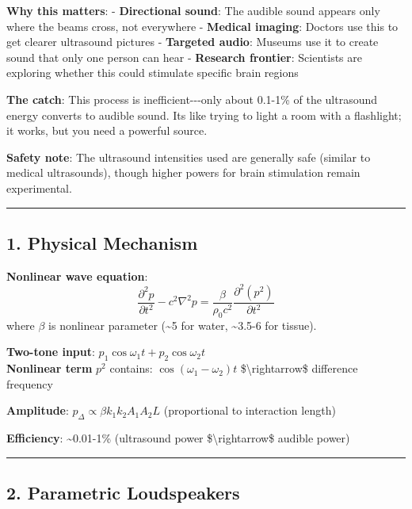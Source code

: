 \textbf{Why this matters}: - \textbf{Directional sound}: The audible
sound appears only where the beams cross, not everywhere -
\textbf{Medical imaging}: Doctors use this to get clearer ultrasound
pictures - \textbf{Targeted audio}: Museums use it to create sound that
only one person can hear - \textbf{Research frontier}: Scientists are
exploring whether this could stimulate specific brain regions

\textbf{The catch}: This process is inefficient-\/-\/-only about 0.1-1\%
of the ultrasound energy converts to audible sound. It\textquotesingle s
like trying to light a room with a flashlight; it works, but you need a
powerful source.

\textbf{Safety note}: The ultrasound intensities used are generally safe
(similar to medical ultrasounds), though higher powers for brain
stimulation remain experimental.

\begin{center}\rule{0.5\linewidth}{0.5pt}\end{center}

\subsection{\texorpdfstring{1. Physical Mechanism
}{1. Physical Mechanism }}\label{physical-mechanism}

\textbf{Nonlinear wave equation}:
\[\frac{\partial^2 p}{\partial t^2} - c^2 \nabla^2 p = \frac{\beta}{\rho_0 c^2} \frac{\partial^2 (p^2)}{\partial t^2}\]
where \(\beta\) is nonlinear parameter (\textasciitilde5 for water,
\textasciitilde3.5-6 for tissue).

\textbf{Two-tone input}: \(p_1 \cos\omega_1 t + p_2 \cos\omega_2 t\)\\
\textbf{Nonlinear term} \(p^2\) contains: \(\cos(\omega_1 - \omega_2)t\)
\$\textbackslash rightarrow\$ difference frequency

\textbf{Amplitude}: \(p_\Delta \propto \beta k_1 k_2 A_1 A_2 L\)
(proportional to interaction length)

\textbf{Efficiency}: \textasciitilde0.01-1\% (ultrasound power
\$\textbackslash rightarrow\$ audible power)

\begin{center}\rule{0.5\linewidth}{0.5pt}\end{center}

\subsection{\texorpdfstring{2. Parametric Loudspeakers
}{2. Parametric Loudspeakers }}\label{parametric-loudspeakers}

